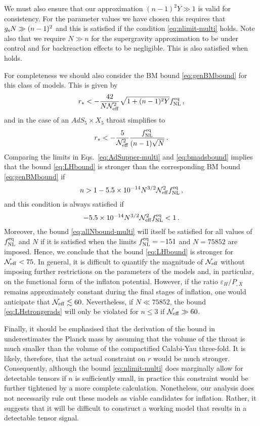 We must also ensure that our approximation $(n-1)^2Y \gg 1$ 
is valid for consistency.  
For the parameter values we have chosen this requires that 
$g_\mathrm{s} N \gg  (n-1)^2$ 
and this is satisfied if the condition \eqref{eq:nlimit-multi} 
holds. Note also that we require $N \gg n$ for the supergravity 
approximation to be under control and for backreaction effects to 
be negligible. This is also satisfied when   
holds. 


For completeness we should also consider the 
BM bound \eqref{eq:genBMbound} for this class of models. This is given by 
% 
\begin{equation}
\label{eq:BMAdS-multi}
r_* < -\frac{42}{N \mathcal{N}_\mathrm{eff}^2}\sqrt{1 +(n-1)^2Y}f_{\mathrm{NL}}^{\mathrm{eq}} \,,
\end{equation}
%  
and in the case of an $AdS_5 \times X_5$ throat simplifies to
%  
\begin{equation}
\label{eq:bmadsbound}
r_* < -\frac{5}{\mathcal{N}_\mathrm{eff}^2} 
\frac{f_{\mathrm{NL}}^{\mathrm{eq}}}{(n-1)\sqrt{N}} \,.
\end{equation}
%  
Comparing the limits in Eqs.~\eqref{eq:AdSupper-multi} and
\eqref{eq:bmadsbound} 
implies that the bound \eqref{eq:LHbound} is stronger than the corresponding BM
bound \eqref{eq:genBMbound} if 
% 
\begin{equation}
\label{eq:LHstrongerads}
n > 1 -5.5 \times 10^{-14} N^{3/2} \mathcal{N}_\mathrm{eff}^2 f_{\mathrm{NL}}^{\mathrm{eq}} \,,
\end{equation}
% 
and this condition is always satisfied if 
% 
\begin{equation}
\label{eq:allNbound-multi}
-5.5 \times 10^{-14} N^{3/2} \mathcal{N}_\mathrm{eff}^2 f_{\mathrm{NL}}^{\mathrm{eq}}  <1  \, .
\end{equation}
% 
Moreover, the bound \eqref{eq:allNbound-multi} will itself be satisfied for 
all values of $f_{\mathrm{NL}}^{\mathrm{eq}}$ and $N$ if it is satisfied when the limits 
$f_{\mathrm{NL}}^{\mathrm{eq}} =-151$ and $N=75852$ are imposed. Hence, we conclude that the bound
\eqref{eq:LHbound} 
is stronger for $\mathcal{N}_\mathrm{eff} < 75$. 
In general, it is difficult to quantify 
the magnitude of $\mathcal{N}_\mathrm{eff}$ without 
imposing further restrictions on the parameters of the models 
and, in particular, on the functional form of the inflaton potential. 
However, if the ratio $\varepsilon_H/P_{,X}$ remains approximately 
constant during the final stages of inflation, one would anticipate that 
$\mathcal{N}_\mathrm{eff} \lesssim 60$. Nevertheless, if $N \ll 75852$, the bound 
\eqref{eq:LHstrongerads} will only be violated for $n \le 3$ if 
$\mathcal{N}_\mathrm{eff} \gg 60$.  


Finally, it should be emphasised that the derivation of the bound in
underestimates the Planck mass by assuming that 
the volume of the throat is much smaller 
than the volume of the compactified Calabi-Yau 
three-fold. It is likely, therefore, 
that the actual constraint on $r$ would be much stronger. Consequently, 
although the bound \eqref{eq:nlimit-multi}  
does marginally allow for detectable tensors if $n$ is sufficiently 
small, in practice this constraint would be further tightened by a more 
complete calculation. Nonetheless, our analysis does not necessarily 
rule out these models as viable candidates for inflation. Rather, it  
suggests that it will be difficult to construct a working model 
that results in a detectable tensor signal.   


